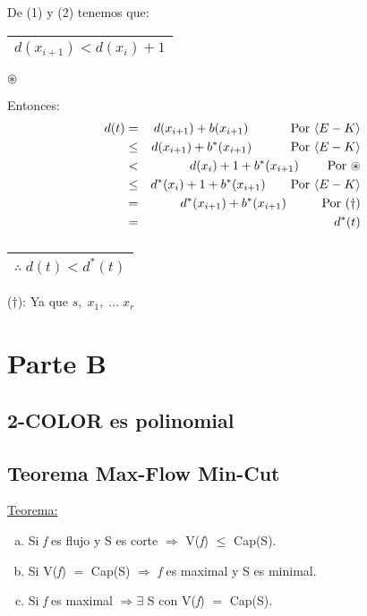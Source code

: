 \documentclass[12pt,a4paper]{report}
\begin{document}
\begin{enumerate}
\begin{enumerate}[a)]
				\vspace{5mm}
				De (1) y (2) tenemos que: \begin{tabular}{|c|} \hline $d(x_{i+1}) < d(x_{i}) +1 $ \\ \hline \end{tabular} $\circledast$
			
				Entonces:
				\begin{eqnarray}
				\nonumber d(t) & = & d(x_{i+1}) + b(x_{i+1}) \qquad\;\;\;\;\;\textup{Por }\langle E-K \rangle\\
				\nonumber & \leq & d(x_{i+1}) + b^{*}(x_{i+1}) \qquad\;\;\;\;\textup{Por }\langle E-K \rangle\\
				\nonumber & < & d(x_{i}) +1 + b^{*}(x_{i+1}) \qquad\;\textup{Por } \circledast \\
				\nonumber & \leq & d^{*}(x_{i}) + 1 + b^{*}(x_{i+1}) \qquad\textup{Por }\langle E-K \rangle \\
				\nonumber & = & d^{*}(x_{i+1}) + b^{*}(x_{i+1}) \qquad\;\;\;\textup{Por } (\dag) \\
				\nonumber & = & d^{*}(t)
				\end{eqnarray}
				$\qquad\qquad\qquad\;\;\;$
				\begin{tabular}{|c|} \hline $\therefore \; d(t) < d^{*}(t)$ \\ \hline \end{tabular}

				($\dag$): Ya que $s, \; x_{1}, \; \dotsc \; x_{r}$
			\end{enumerate}
		\end{enumerate}
	
	

\chapter{Parte B}

	\section{2-COLOR es polinomial}
	
	
	\section{Teorema Max-Flow Min-Cut}
		\underline{Teorema:}
		\begin{enumerate}[a)]
			\item Si \textit{f} es flujo y S es corte $\Rightarrow$ V(\textit{f}) $\leq$ Cap(S).
			\item Si V(\textit{f}) $=$ Cap(S) $\Rightarrow$ \textit{f} es maximal y S es minimal.
			\item Si \textit{f} es maximal $\Rightarrow \exists$ S con V(\textit{f}) $=$ Cap(S).
		\end{enumerate}
		
\end{document}
